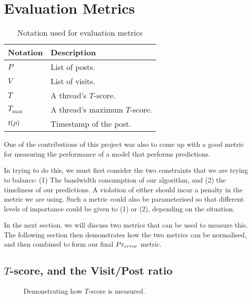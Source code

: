 \renewcommand{\P}{Pr}
\chapter{Evaluation Metrics}


\begin{table}
\begin{center}
\begin{tabular}{l l}
	\hline
Notation	&	Description		\\
	\hline
$P$			&	List of posts. \\
$V$			&	List of visits.\\
$T$			&	A thread's $T$-score. \\
	$T_\text{max}$	&	A thread's maximum $T$-score. \\
$t(\rho)$	&	Timestamp of the post.\\
	\hline
\end{tabular}
\end{center}
	\caption{Notation used for evaluation metrics}
\end{table}


One of the contributions of this project was also to come up with a good metric 
for measuring the performance of a model that performs predictions. 

In trying to do this, we must first consider the two constraints that we are 
trying to balance: (1) The bandwidth consumption of our algorithm, and (2) the 
timeliness of our predictions. A violation of either should incur a penalty in 
the metric we are using. Such a metric could also be parameterised so that 
different levels of importance could be given to (1) or (2), depending on the 
situation.

In the next section, we will discuss two metrics that can be used to measure 
this. The following section then demonstrates how the two metrics can be 
normalised, and then combined to form our final $Pr_{error}$ metric.

\section{$T$-score, and the Visit/Post ratio}

\begin{figure}
	\begin{center}
	
	\caption{Demonstrating how $T$-score is measured.}
	\end{center}
\end{figure}


